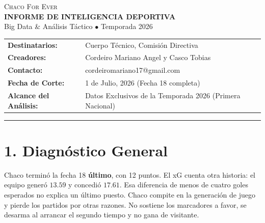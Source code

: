 \documentclass[11pt, a4paper]{article}
\newcommand{\mR}[1]{\textbf{#1}}
\begin{document}
\begin{center}
  \colorbox{primary}{%
    \parbox{\dimexpr\textwidth-2\fboxsep\relax}{%
      \vspace{4mm}
      \centering
      \color{white}
      \textsc{\Large Chaco For Ever} \\
      \smallskip
      \textbf{\Large INFORME DE INTELIGENCIA DEPORTIVA} \\
      \vspace{1mm}
      \small Big Data \& Análisis Táctico $\bullet$ Temporada 2026
      \vspace{4mm}
    }%
  }
\end{center}

\vspace{4mm}

\begin{tabular}{ll}
  \textbf{Destinatarios:} & Cuerpo Técnico, Comisión Directiva \\
  \textbf{Creadores:} & Cordeiro Mariano Angel y Casco Tobias \\
  \textbf{Contacto:} & cordeiromariano17@gmail.com \\
  \textbf{Fecha de Corte:} & 1 de Julio, 2026 (Fecha 18 completa) \\
  \textbf{Alcance del Análisis:} & Datos Exclusivos de la Temporada 2026 (Primera Nacional) \\
\end{tabular}

\vspace{4mm}
\hrule
\vspace{4mm}

\section*{1. Diagnóstico General}

Chaco terminó la fecha 18 \mR{último}, con 12 puntos. El xG cuenta otra historia: el equipo generó $13.59$ y concedió $17.61$. Esa diferencia de menos de cuatro goles esperados no explica un último puesto. Chaco compite en la generación de juego y pierde los partidos por otras razones. No sostiene los marcadores a favor, se desarma al arrancar el segundo tiempo y no gana de visitante.
\end{document}

